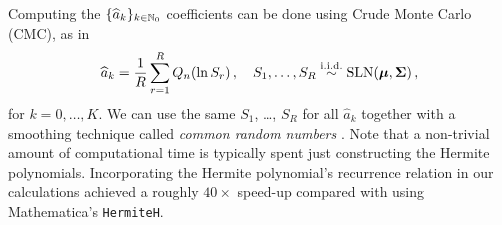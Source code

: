 

Computing the $\{ \widehat{a}_k \}_{k \in \mathbb{N}_0}$ coefficients can be done using Crude Monte Carlo (CMC), as in
\[ \widehat{a}_k = \frac1R \sum_{r=1}^R Q_n(\ln S_r) \,, \quad S_1, \dots, S_R \overset{\mathrm{i.i.d.}}{\sim} \mathrm{SLN}(\bm{\mu}, \bm{\Sigma}) \,, \]
for $k = 0, \dots, K$. We can use the same $S_1$, \dots, $S_R$ for all $\widehat{a}_k$ together with a smoothing technique called \emph{common random numbers} \cite{asmussen2007stochastic,glasserman2003monte}. Note that a non-trivial amount of computational time is typically spent just constructing the Hermite polynomials. Incorporating the Hermite polynomial's recurrence relation in our calculations achieved a roughly $40\times$ speed-up compared with using Mathematica's \texttt{HermiteH}.


